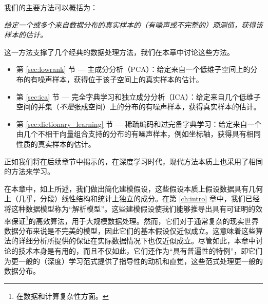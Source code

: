\documentclass[../../book-main_zh.tex]{subfiles}
\begin{document}
我们的主要方法可以概括为：
\begin{tcolorbox}
    \textit{给定一个或多个来自数据分布的真实样本的（有噪声或不完整的）观测值，获得该样本的估计。}
\end{tcolorbox}
这一方法支撑了几个经典的数据处理方法，我们在本章中讨论这些方法。
\begin{itemize}
    \item 第 \ref{sec:lowrank} 节 --- 主成分分析（PCA）：给定来自一个低维子空间上的分布的有噪声样本，获得位于该子空间上的真实样本的估计。
    \item 第 \ref{sec:ica} 节 --- 完全字典学习和独立成分分析（ICA）：给定来自几个低维子空间的并集（\textit{不是}张成空间）上的分布的有噪声样本，获得真实样本的估计。
    \item 第 \ref{sec:dictionary_learning} 节 --- 稀疏编码和过完备字典学习：给定来自一个由几个不相干向量组合支持的分布的有噪声样本，例如坐标轴，获得具有相同性质的真实样本的估计。
\end{itemize}
正如我们将在后续章节中揭示的，在深度学习时代，现代方法本质上也采用了相同的方法来学习。

在本章中，如上所述，我们做出简化建模假设，这些假设本质上假设数据具有几何上（几乎，分段）线性结构和统计上独立的成分。在第 \ref{ch:intro} 章中，我们已经将这种数据模型称为“解析模型”。这些建模假设使我们能够推导出具有可证明的效率保证\footnote{在数据和计算复杂性方面。}的高效算法，用于大规模数据处理。然而，它们对于通常复杂的现实世界数据分布来说是不完美的模型，因此它们的基本假设仅近似成立。这意味着这些算法的详细分析所提供的保证在实际数据情况下也仅近似成立。尽管如此，本章中讨论的技术本身是有用的，而且不仅如此，它们还作为“具有普遍性的特例”，即它们为更一般的（深度）学习范式提供了指导性的动机和直觉，这些范式处理更一般的数据分布。%

\end{document}

